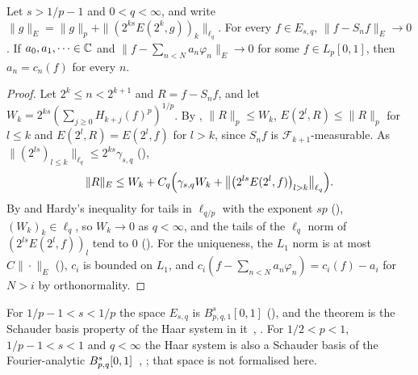 \begin{theorem}
\label{thm:haar-schauder-below-one}
\leanok
{}
Let $s > 1/p - 1$ and $0 < q < \infty$, and write
$\|g\|_{E} = \|g\|_p + \|(2^{ks} E(2^k, g))_k\|_{\ell_q}$. For every $f \in E_{s,q}$,
$\|f - S_n f\|_E \to 0$. If $a_0, a_1, \dots \in \mathbb{C}$ and
$\|f - \sum_{n < N} a_n \varphi_n\|_E \to 0$ for some $f \in L_p[0, 1]$, then $a_n = c_n(f)$ for
every $n$.
\end{theorem}

\begin{proof}
\leanok
Let $2^k \leq n < 2^{k+1}$ and $R = f - S_n f$, and let
$W_k = 2^{ks} (\sum_{j \geq 0} H_{k+j}(f)^p)^{1/p}$. By ,
$\|R\|_p \leq W_k$, $E(2^l, R) \leq \|R\|_p$ for $l \leq k$ and $E(2^l, R) = E(2^l, f)$ for
$l > k$, since $S_n f$ is $\mathcal{F}_{k+1}$-measurable. As
$\|(2^{ls})_{l \leq k}\|_{\ell_q} \leq 2^{ks} \gamma_{s,q}$ (),
\[
  \|R\|_E \leq W_k + C_q \Bigl( \gamma_{s,q} W_k + \bigl\| \bigl( 2^{ls} E(2^l, f)
  \bigr)_{l > k} \bigr\|_{\ell_q} \Bigr) .
\]
By  and Hardy's inequality for tails in $\ell_{q/p}$ with the exponent
$sp$ (), $(W_k)_k \in \ell_q$, so $W_k \to 0$ as $q < \infty$, and
the tails of the $\ell_q$ norm of $(2^{ls} E(2^l, f))_l$ tend to $0$
(). For the uniqueness, the
$L_1$ norm is at most $C \|\cdot\|_E$ (), $c_i$ is bounded on $L_1$, and
$c_i(f - \sum_{n<N} a_n \varphi_n) = c_i(f) - a_i$ for $N > i$ by orthonormality.
\end{proof}

For $1/p - 1 < s < 1/p$ the space $E_{s,q}$ is $B^s_{p,q,1}[0, 1]$
(), and the theorem is the Schauder basis property of the Haar
system in it~\cite{Oswald1981}, \cite[Theorem~1]{Oswald2018}. For $1/2 < p < 1$,
$1/p - 1 < s < 1$ and $q < \infty$ the Haar system is also a Schauder basis of the
Fourier-analytic $B^{s}_{p,q}[0, 1]$~\cite{TriebelHaar1978},
\cite[Theorem~2]{Oswald2018}; that space is not formalised here.

